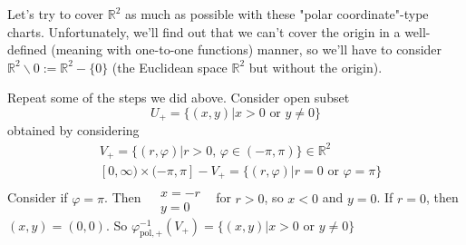 \documentclass[10pt]{amsart}
\begin{document}
\begin{multicols*}{2}


Let's try to cover $\mathbb{R}^2$ as much as possible with these "polar coordinate"-type charts. Unfortunately, we'll find out that we can't cover the origin in a well-defined (meaning with one-to-one functions) manner, so we'll have to consider $\mathbb{R}^2\backslash 0 := \mathbb{R}^2 - \lbrace 0 \rbrace$ (the Euclidean space $\mathbb{R}^2$ but without the origin).

Repeat some of the steps we did above. Consider open subset 
\[
U_+ = \lbrace (x, y) | x > 0 \text{ or } y \neq 0 \rbrace
\]
obtained by considering
\[
\begin{aligned}
& V_+ = \lbrace (r, \varphi) | r >0, \, \varphi \in (-\pi, \pi) \rbrace \in \mathbb{R}^2 \\
& [0, \infty) \times (-\pi, \pi] - V_+ = \lbrace (r, \varphi) | r = 0 \text{ or } \varphi = \pi \rbrace
\end{aligned}
\]
Consider if $\varphi = \pi$. Then $\begin{aligned} & \quad \\
	& x = -r \\
	& y = 0 \end{aligned}$ \, for $r> 0$, so $x<0 $ and $y=0$. If $r=0$, then $(x, y) = (0,0)$. So $\varphi^{-1}_{\text{pol}, +}(V_+) = \lbrace ( x, y) | x > 0 \text{ or } y\neq 0 \rbrace$


\end{multicols*}
\end{document}
